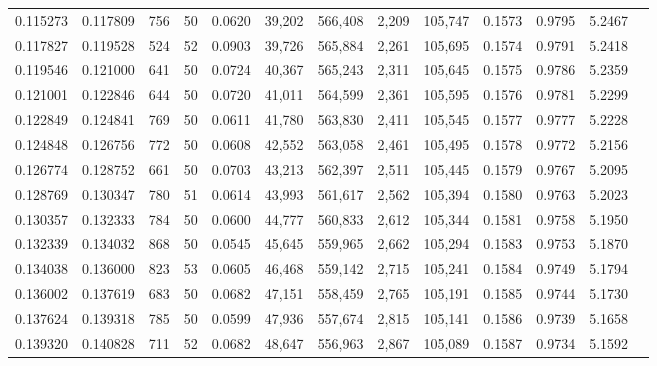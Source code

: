\begin{tabular}{rrrrrrrrrrrrr}
0.115273 & 0.117809 &   756 &  50 &                                     0.0620 &  39,202 & 566,408 &   2,209 & 105,747 & 0.1573 & 0.9795 & 5.2467 \\
0.117827 & 0.119528 &   524 &  52 &                                     0.0903 &  39,726 & 565,884 &   2,261 & 105,695 & 0.1574 & 0.9791 & 5.2418 \\
0.119546 & 0.121000 &   641 &  50 &                                     0.0724 &  40,367 & 565,243 &   2,311 & 105,645 & 0.1575 & 0.9786 & 5.2359 \\
0.121001 & 0.122846 &   644 &  50 &                                     0.0720 &  41,011 & 564,599 &   2,361 & 105,595 & 0.1576 & 0.9781 & 5.2299 \\
0.122849 & 0.124841 &   769 &  50 &                                     0.0611 &  41,780 & 563,830 &   2,411 & 105,545 & 0.1577 & 0.9777 & 5.2228 \\
0.124848 & 0.126756 &   772 &  50 &                                     0.0608 &  42,552 & 563,058 &   2,461 & 105,495 & 0.1578 & 0.9772 & 5.2156 \\
0.126774 & 0.128752 &   661 &  50 &                                     0.0703 &  43,213 & 562,397 &   2,511 & 105,445 & 0.1579 & 0.9767 & 5.2095 \\
0.128769 & 0.130347 &   780 &  51 &                                     0.0614 &  43,993 & 561,617 &   2,562 & 105,394 & 0.1580 & 0.9763 & 5.2023 \\
0.130357 & 0.132333 &   784 &  50 &                                     0.0600 &  44,777 & 560,833 &   2,612 & 105,344 & 0.1581 & 0.9758 & 5.1950 \\
0.132339 & 0.134032 &   868 &  50 &                                     0.0545 &  45,645 & 559,965 &   2,662 & 105,294 & 0.1583 & 0.9753 & 5.1870 \\
0.134038 & 0.136000 &   823 &  53 &                                     0.0605 &  46,468 & 559,142 &   2,715 & 105,241 & 0.1584 & 0.9749 & 5.1794 \\
0.136002 & 0.137619 &   683 &  50 &                                     0.0682 &  47,151 & 558,459 &   2,765 & 105,191 & 0.1585 & 0.9744 & 5.1730 \\
0.137624 & 0.139318 &   785 &  50 &                                     0.0599 &  47,936 & 557,674 &   2,815 & 105,141 & 0.1586 & 0.9739 & 5.1658 \\
0.139320 & 0.140828 &   711 &  52 &                                     0.0682 &  48,647 & 556,963 &   2,867 & 105,089 & 0.1587 & 0.9734 & 5.1592 \\

\end{tabular}
